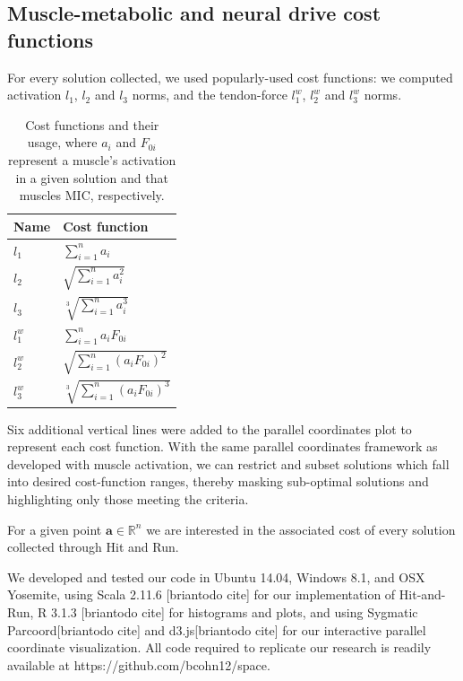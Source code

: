 \subsection{Muscle-metabolic and neural drive cost functions}

For every solution collected, we used popularly-used cost functions: we computed activation $l_1$, $l_2$ and $l_3$ norms, and the tendon-force $l_1^w$, $l_2^w$ and $l_3^w$ norms.

\begin{table}[h]
\centering
\begin{tabular}{@{}ll@{}}
\toprule
\textbf{Name} & \textbf{Cost function}  \\ \midrule
$l_1$            & $\sum_{i=1}^n a_i$                                     \\
$l_2$            & $\sqrt{\sum_{i=1}^n a_i^2}$                                    \\
$l_3$            & $\sqrt[3]{\sum_{i=1}^n a_i^3}$                                   \\
$l_1^w$            & $\sum_{i=1}^n a_i F_{0i}$                                    \\
$l_2^w$            & $\sqrt{\sum_{i=1}^n (a_i F_{0i})^2}$                                  \\
$l_3^w$            & $\sqrt[3]{\sum_{i=1}^n (a_i F_{0i})^3}$                                    \\ \bottomrule
\end{tabular}

\caption{Cost functions and their usage, where $a_i$ and $F_{0i}$ represent a muscle's activation in a given solution and that muscles MIC, respectively.}
\label{cost_function_tabls}

\end{table}

 Six additional vertical lines were added to the parallel coordinates plot to represent each cost function. With the same parallel coordinates framework as developed with muscle activation, we can restrict and subset solutions which fall into desired cost-function ranges, thereby masking sub-optimal solutions and highlighting only those meeting the criteria.


For a given point $\textbf{a} \in \mathbb{R}^n$ we are interested in the associated cost of every solution collected through Hit and Run.

We developed and tested our code in  Ubuntu 14.04, Windows 8.1, and OSX Yosemite, using Scala 2.11.6 [briantodo cite] for our implementation of Hit-and-Run, R 3.1.3 [briantodo cite] for histograms and plots, and using Sygmatic Parcoord[briantodo cite] and d3.js[briantodo cite] for our interactive parallel coordinate visualization. All code required to replicate our research is readily available at https://github.com/bcohn12/space.